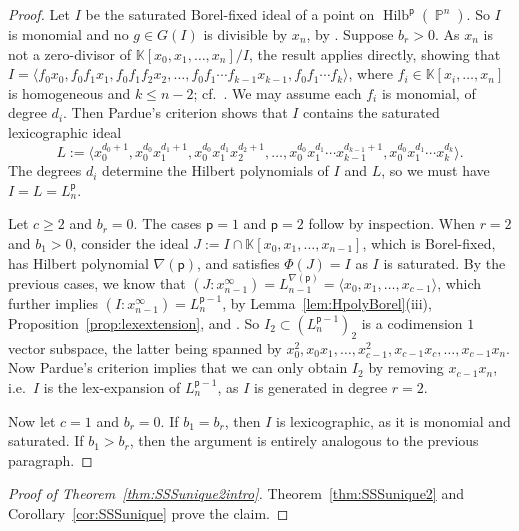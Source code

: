 \documentclass[12pt]{amsart}%
\theoremstyle{definition}%
\DeclareMathOperator{\hilb}{Hilb}%
\DeclareMathOperator{\PP}{\mathbb{P}}%
\newcommand{\hp}{\mathsf{p}}%
\newcommand{\lift}{\Phi}%
\newcommand{\kk}{\mathbb{K}}%
\begin{document}
\begin{proof}
  Let $I$ be the saturated Borel-fixed ideal of a point on
  $\hilb^{\hp}(\PP^n)$.  So $I$ is monomial and no $g \in G(I)$ is
  divisible by $x_n$, by \cite[II, Proposition~9]{Pardue--1994}.
  Suppose $b_r > 0$.  As $x_n$ is not a zero-divisor of $\kk[x_0, x_1,
    \ldots, x_n] / I$, the result \cite[Proposition~2]{Gotzmann--1989}
  applies directly, showing that $I = \langle f_0 x_0, f_0 f_1 x_1,
  f_0 f_1 f_2 x_2, \ldots, f_0 f_1 \cdots f_{k-1} x_{k-1}, f_0 f_1
  \cdots f_k \rangle$, where $f_i \in \kk[x_i, \ldots, x_n]$ is
  homogeneous and $k \le n-2$;
  cf.\ \cite[Theorem~4.1]{Reeves--Stillman--1997}.  We may assume each
  $f_i$ is monomial, of degree $d_i$.  Then Pardue's criterion shows
  that $I$ contains the saturated lexicographic ideal
  \[
  L := \langle x_0^{d_0 +1}, x_0^{d_0} x_1^{d_1 +1}, x_0^{d_0}
  x_1^{d_1} x_2^{d_2 +1}, \ldots, x_0^{d_0} x_1^{d_1} \cdots
  x_{k-1}^{d_{k-1} +1}, x_0^{d_0} x_1^{d_1} \cdots x_k^{d_k} \rangle.
  \]
  The degrees $d_i$ determine the Hilbert polynomials of $I$ and $L$,
  so we must have $I = L = L^{\hp}_n$.

  Let $c \ge 2$ and $b_r = 0$. The cases $\hp = 1$ and $\hp =2$ follow
  by inspection.  When $r = 2$ and $b_1 > 0$, consider the ideal $J :=
  I \cap \kk[x_0, x_1, \ldots, x_{n-1}]$, which is Borel-fixed, has
  Hilbert polynomial $\nabla(\hp)$, and satisfies $\lift(J) = I$ as
  $I$ is saturated.  By the previous cases, we know that $(J :
  x_{n-1}^{\infty}) = L^{\nabla(\hp)}_{n-1} = \langle x_0, x_1,
  \ldots, x_{c-1} \rangle$, which further implies $(I :
  x_{n-1}^{\infty}) = L^{\hp -1}_n$, by
  Lemma~\ref{lem:HpolyBorel}(iii),
  Proposition~\ref{prop:lexextension}, and \cite[II,
    Proposition~9]{Pardue--1994}.  So $I_2 \subset (L^{\hp -1}_n)_2$
  is a codimension $1$ vector subspace, the latter being spanned by
  $x_0^2, x_0 x_1, \ldots, x_{c-1}^2, x_{c-1} x_c, \ldots, x_{c-1}
  x_n$.  Now Pardue's criterion implies that we can only obtain $I_2$
  by removing $x_{c-1} x_n$, i.e.\ $I$ is the lex-expansion of $L^{\hp
    -1}_n$, as $I$ is generated in degree $r = 2$.

  Now let $c = 1$ and $b_r = 0$. If $b_1 = b_r$, then $I$ is
  lexicographic, as it is monomial and saturated.  If $b_1 > b_r$,
  then the argument is entirely analogous to the previous paragraph.
\end{proof}

\begin{proof}[Proof of Theorem~\ref{thm:SSSunique2intro}]
  Theorem~\ref{thm:SSSunique2} and Corollary~\ref{cor:SSSunique} prove
  the claim.
\end{proof}
\end{document}
